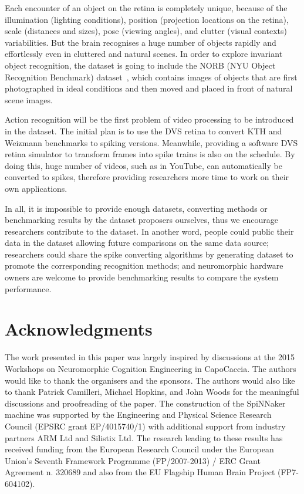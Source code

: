 \documentclass{frontiersENG} %
\begin{document}
Each encounter of an object on the retina is completely unique, because of the illumination (lighting conditions), position (projection locations on the retina), scale (distances and sizes), pose (viewing angles), and clutter (visual contexts) variabilities.
But the brain recognises a huge number of objects rapidly and effortlessly even in cluttered and natural scenes.
In order to explore invariant object recognition, the dataset is going to include the NORB (NYU Object Recognition Benchmark) dataset~\citep{lecun2004learning}, which contains images of objects that are first photographed in ideal conditions and then moved and placed in front of natural scene images.

Action recognition will be the first problem of video processing to be introduced in the dataset.
The initial plan is to use the DVS retina to convert KTH and Weizmann benchmarks to spiking versions.
Meanwhile, providing a software DVS retina simulator to transform  frames into spike trains is also on the schedule.
By doing this, huge number of videos, such as in YouTube, can automatically be converted to spikes, therefore providing researchers more time to work on their own applications.

In all, it is impossible to provide enough datasets, converting methods or benchmarking results by the dataset proposers ourselves, thus we encourage researchers contribute to the dataset.
In another word, people could public their data in the dataset allowing future comparisons on the same data source;
researchers could share the spike converting algorithms by generating dataset to promote the corresponding recognition methods;
and neuromorphic hardware owners are welcome to provide benchmarking results to compare the system performance.

\section*{Acknowledgments}

The work presented in this paper was largely inspired by discussions at the 2015 Workshops on Neuromorphic Cognition Engineering in CapoCaccia.
The authors would like to thank the organisers and the sponsors.
The authors would also like to thank Patrick Camilleri, Michael Hopkins, and John Woods for the meaningful discussions and proofreading of the paper.
The construction of the SpiNNaker machine was supported by the Engineering and Physical Science Research Council (EPSRC grant EP/4015740/1) with additional support from industry partners ARM Ltd and Silistix Ltd.
The research leading to these results has received funding from the European Research Council under the European Union's Seventh Framework Programme (FP/2007-2013) / ERC Grant Agreement n. 320689 and also from the EU Flagship Human Brain Project (FP7-604102). 



%
\end{document}
